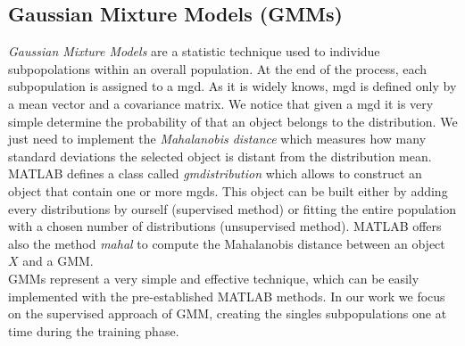 \subsection{Gaussian Mixture Models (GMMs)}
\label{subsec:gmm}

\textit{Gaussian Mixture Models} are a statistic technique used to individue subpopolations within an overall population. At the end of the process, each subpopulation is assigned to a \gls{mgd}.  As it is widely knows, \gls{mgd} is defined only by a mean vector and a covariance matrix. We notice that given a \gls{mgd} it is very simple determine the probability of that an object belongs to the distribution. We just need to implement the \textit{Mahalanobis distance} which measures how many standard deviations the selected object is distant from the distribution mean. \\
%
MATLAB defines a class called \textit{gmdistribution} which allows to construct an object that contain one or more \gls{mgd}s. This object can be built either by adding every distributions by ourself (supervised method) or fitting the entire population with a chosen number of distributions (unsupervised method). MATLAB offers also the method \textit{mahal} to compute the Mahalanobis distance between an object $X$ and a GMM. \\
%
GMMs represent a very simple and effective technique, which can be easily implemented with the pre-established MATLAB methods. In our work we focus on the supervised approach of GMM, creating the singles subpopulations one at time during the training phase.
